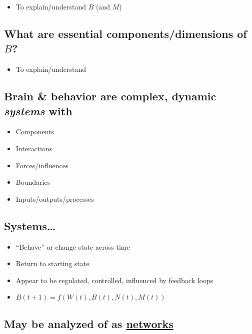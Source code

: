 \documentclass[
  letterpaper,
  DIV=11,
  numbers=noendperiod]{scrartcl}
\providecommand{\tightlist}{%
  \setlength{\itemsep}{0pt}\setlength{\parskip}{0pt}}\usepackage{longtable,booktabs,array}
\begin{document}
\begin{itemize}
\tightlist
\item
  To explain/understand \(B\) (and \(M\))
\end{itemize}

\subsection{\texorpdfstring{What are essential components/dimensions of
\(B\)?}{What are essential components/dimensions of B?}}\label{what-are-essential-componentsdimensions-of-b}

\begin{itemize}
\tightlist
\item
  To explain/understand
\end{itemize}

\subsection{\texorpdfstring{Brain \& behavior are complex, dynamic
\emph{systems}
with}{Brain \& behavior are complex, dynamic systems with}}\label{brain-behavior-are-complex-dynamic-systems-with}

\begin{itemize}
\tightlist
\item
  Components
\item
  Interactions
\item
  Forces/influences
\item
  Boundaries
\item
  Inputs/outputs/processes
\end{itemize}

\subsection{Systems\ldots{}}\label{systems}

\begin{itemize}
\tightlist
\item
  ``Behave'' or change state across time
\item
  Return to starting state
\item
  Appear to be regulated, controlled, influenced by feedback loops
\item
  \(B(t+1) = f(W(t), B(t), N(t), M(t))\)
\end{itemize}

\subsection{\texorpdfstring{May be analyzed of as
\href{https://en.wikipedia.org/wiki/Network_science}{networks}}{May be analyzed of as networks}}\label{may-be-analyzed-of-as-networks}
\end{document}

